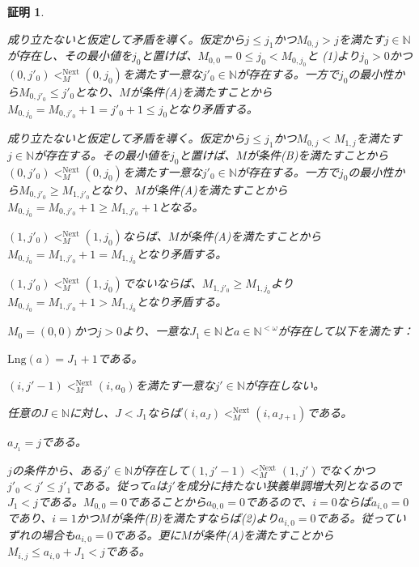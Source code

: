 \documentclass[dvipdfmx,uplatex]{jsarticle}
\theoremstyle{customnonumberbreakfortheorem}
\theoremstyle{customnonumberbreakforproof}
\newtheorem{hideableproof}{証明}
\begin{document}
\begin{hideableproof}
	\begin{penumerate}
		\item 成り立たないと仮定して矛盾を導く。仮定から\(j \leq j_1\)かつ\(M_{0,j} > j\)を満たす\(j \in \mathbb{N}\)が存在し、その最小値を\(j_0\)と置けば、\(M_{0,0} = 0 \leq j_0 < M_{0,j_0}\)と (1)より\(j_0 > 0\)かつ\((0,j'_0) <_M^{\textrm{Next}} (0,j_0)\)を満たす一意な\(j'_0 \in \mathbb{N}\)が存在する。一方で\(j_0\)の最小性から\(M_{0,j'_0} \leq j'_0\)となり、\(M\)が条件(A)を満たすことから\(M_{0,j_0} = M_{0,j'_0}+1 = j'_0+1 \leq j_0\)となり矛盾する。
		\item 成り立たないと仮定して矛盾を導く。仮定から\(j \leq j_1\)かつ\(M_{0,j} < M_{1,j}\)を満たす\(j \in \mathbb{N}\)が存在する。その最小値を\(j_0\)と置けば、\(M\)が条件(B)を満たすことから\((0,j'_0) <_M^{\textrm{Next}} (0,j_0)\)を満たす一意な\(j'_0 \in \mathbb{N}\)が存在する。一方で\(j_0\)の最小性から\(M_{0,j'_0} \geq M_{1,j'_0}\)となり、\(M\)が条件(A)を満たすことから\(M_{0,j_0} = M_{0,j'_0}+1 \geq M_{1,j'_0}+1\)となる。
		\item[] \((1,j'_0) <_M^{\textrm{Next}} (1,j_0)\)ならば、\(M\)が条件(A)を満たすことから\(M_{0,j_0} = M_{1,j'_0}+1 = M_{1,j_0}\)となり矛盾する。
		\item[] \((1,j'_0) <_M^{\textrm{Next}} (1,j_0)\)でないならば、\(M_{1,j'_0} \geq M_{1,j_0}\)より\(M_{0,j_0} = M_{1,j'_0}+1 > M_{1,j_0}\)となり矛盾する。
		\item \(M_0 = (0,0)\)かつ\(j > 0\)より、一意な\(J_1 \in \mathbb{N}\)と\(a \in \mathbb{N}^{< \omega}\)が存在して以下を満たす：
		\begin{indented}
			\item \(\textrm{Lng}(a) = J_1+1\)である。
			\item \((i,j'-1) <_M^{\textrm{Next}} (i,a_0)\)を満たす一意な\(j' \in \mathbb{N}\)が存在しない。
			\item 任意の\(J \in \mathbb{N}\)に対し、\(J < J_1\)ならば\((i,a_J) <_M^{\textrm{Next}} (i,a_{J+1})\)である。
			\item \(a_{J_1} = j\)である。
		\end{indented}
		\item[] \(j\)の条件から、ある\(j' \in \mathbb{N}\)が存在して\((1,j'-1) <_M^{\textrm{Next}} (1,j')\)でなくかつ\(j'_0 < j' \leq j'_1\)である。従って\(a\)は\(j'\)を成分に持たない狭義単調増大列となるので\(J_1 < j\)である。\(M_{0,0} = 0\)であることから\(a_{0,0} = 0\)であるので、\(i = 0\)ならば\(a_{i,0} = 0\)であり、\(i = 1\)かつ\(M\)が条件(B)を満たすならば(2)より\(a_{i,0} = 0\)である。従っていずれの場合も\(a_{i,0} = 0\)である。更に\(M\)が条件(A)を満たすことから\(M_{i,j} \leq a_{i,0} + J_1 < j\)である。
	\end{penumerate}
\end{hideableproof}
\end{document}
